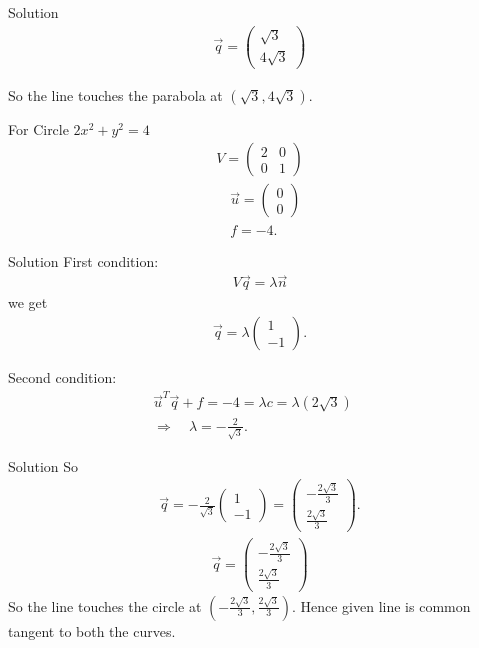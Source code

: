 \documentclass{beamer}
\begin{document}
\begin{frame}{Solution}
\begin{align}
{\vec{q} = \begin{pmatrix}\sqrt{3} \\ 4\sqrt{3}\end{pmatrix}}
\end{align}

So the line touches the parabola at $(\sqrt{3}, 4\sqrt{3})$.

For Circle $2x^2 + y^2 = 4$
\begin{align}
V = \begin{pmatrix}2 & 0 \\ 0 & 1\end{pmatrix}\\
\quad 
\vec{u} = \begin{pmatrix}0 \\ 0\end{pmatrix}\\
\quad 
f = -4.
\end{align}   
\end{frame}
\begin{frame}{Solution}
\noindent First condition:
\begin{align}
V\vec{q} = \lambda \vec{n}
\end{align}
we get 
\begin{align}
\vec{q} = \lambda \begin{pmatrix}1 \\ -1\end{pmatrix}.
\end{align}

\noindent Second condition:
\begin{align}
\vec{u}^T\vec{q} + f = -4 = \lambda c = \lambda(2\sqrt{3})
\quad \\ \Rightarrow \quad \lambda = -\frac{2}{\sqrt{3}}.
\end{align}
\end{frame}
\begin{frame}{Solution}
So
\begin{align}
\vec{q} = -\frac{2}{\sqrt{3}} \begin{pmatrix}1 \\ -1\end{pmatrix}
= \begin{pmatrix}-\tfrac{2\sqrt{3}}{3} \\ \tfrac{2\sqrt{3}}{3}\end{pmatrix}.
\end{align}
\begin{align}
{\vec{q} = \begin{pmatrix}-\tfrac{2\sqrt{3}}{3} \\ \tfrac{2\sqrt{3}}{3}\end{pmatrix}}
\end{align}
So the line touches the circle at $\left(-\tfrac{2\sqrt{3}}{3}, \tfrac{2\sqrt{3}}{3}\right)$.
Hence given line is common tangent to both the curves.    
\end{frame}
\end{document}
